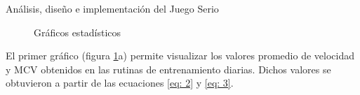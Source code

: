 \begin{thesischapter}{2} {Análisis, diseño e implementación del Juego Serio}
\begin{figure}[ht]
    \centering

    \caption{Gráficos estadísticos}
    \label{fig: statics-graphs}
\end{figure}

El primer gráfico (figura \ref{fig: statics-graphs}a) permite visualizar los valores promedio de velocidad y MCV
obtenidos en las rutinas de entrenamiento diarias. Dichos valores se obtuvieron a partir de las ecuaciones \ref{eq: 2} y \ref{eq: 3}.    


\end{thesischapter}
